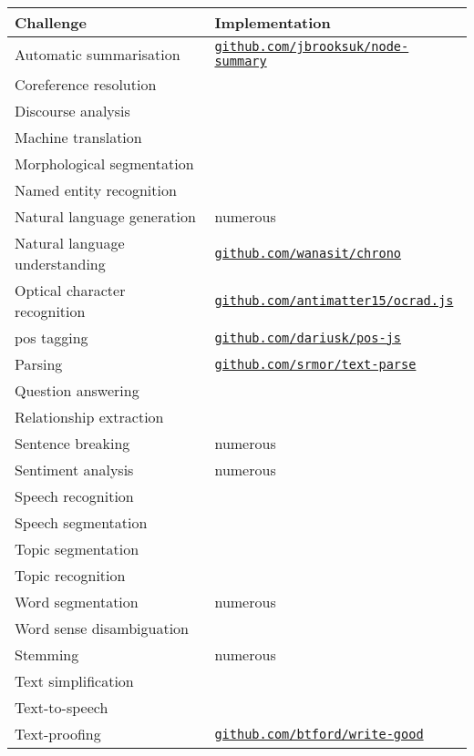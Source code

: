 {\footnotesize
\begin{tabular}{ l p{5.25cm} }
  Challenge &
  Implementation
  \\ \hline
  Automatic summarisation &{\raggedright
  \href{https://github.com/jbrooksuk/node-summary}{\nolinkurl{github.com/jbrooksuk/node-summary}}
  }\\
  Coreference resolution &
  \\
  Discourse analysis &
  \\
  Machine translation &
  \\
  Morphological segmentation &
  \\
  Named entity recognition &
  \\
  Natural language generation &{\raggedright
  numerous
  }\\
  Natural language understanding &{\raggedright
  \href{https://github.com/wanasit/chrono}{\nolinkurl{github.com/wanasit/chrono}}
  }\\
  Optical character recognition &{\raggedright
  \href{https://github.com/antimatter15/ocrad.js}{\nolinkurl{github.com/antimatter15/ocrad.js}}
  }\\
  \gls{pos} tagging &{\raggedright
  \href{https://github.com/dariusk/pos-js}{\nolinkurl{github.com/dariusk/pos-js}}
  }\\
  Parsing &{\raggedright
  \href{https://github.com/srmor/text-parse}{\nolinkurl{github.com/srmor/text-parse}}
  }\\
  Question answering &
  \\
  Relationship extraction &
  \\
  Sentence breaking &{\raggedright
  numerous
  }\\
  Sentiment analysis &{\raggedright
  numerous
  }\\
  Speech recognition &
  \\
  Speech segmentation &
  \\
  Topic segmentation &
  \\
  Topic recognition &
  \\
  Word segmentation &{\raggedright
  numerous
  }\\
  Word sense disambiguation &
  \\
  Stemming &{\raggedright
  numerous
  }\\
  Text simplification &
  \\
  Text-to-speech &
  \\
  Text-proofing &{\raggedright
  \href{https://github.com/btford/write-good}{\nolinkurl{github.com/btford/write-good}}
}
\end{tabular}}
